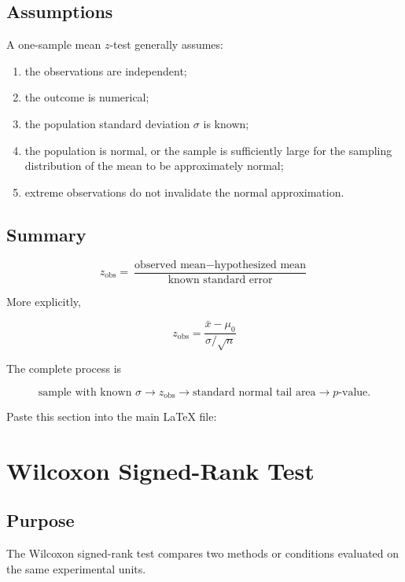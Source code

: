 \documentclass[11pt]{article}
\begin{document}
\subsection{Assumptions}

A one-sample mean \(z\)-test generally assumes:

\begin{enumerate}[noitemsep]
    \item the observations are independent;

    \item the outcome is numerical;

    \item the population standard deviation \(\sigma\) is known;

    \item the population is normal, or the sample is sufficiently large
    for the sampling distribution of the mean to be approximately
    normal;

    \item extreme observations do not invalidate the normal
    approximation.
\end{enumerate}

\subsection{Summary}

\[
\boxed{
z_{\mathrm{obs}}
=
\frac{
\text{observed mean}-\text{hypothesized mean}
}{
\text{known standard error}
}
}
\]

More explicitly,

\[
\boxed{
z_{\mathrm{obs}}
=
\frac{\bar{x}-\mu_0}{\sigma/\sqrt{n}}
}
\]

The complete process is

\[
\boxed{
\text{sample with known }\sigma
\rightarrow
z_{\mathrm{obs}}
\rightarrow
\text{standard normal tail area}
\rightarrow
p\text{-value}.
}
\]

Paste this section into the main LaTeX file:

\section{Wilcoxon Signed-Rank Test}

\subsection{Purpose}

The Wilcoxon signed-rank test compares two methods or conditions evaluated
on the same experimental units.
\end{document}
